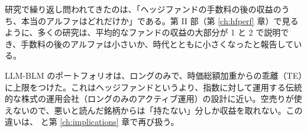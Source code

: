 研究で繰り返し問われてきたのは、「ヘッジファンドの手数料の後の収益のうち、本当のアルファはどれだけか」である。第 II 部（第 \ref{ch:hfperf} 章）で見るように、多くの研究は、平均的なファンドの収益の大部分が 1 と 2 で説明でき、手数料の後のアルファは小さいか、時代とともに小さくなったと報告している。

\begin{projbox}
LLM-BLM のポートフォリオは、ロングのみで、時価総額加重からの乖離（TE）に上限をつけた。これはヘッジファンドというより、指数に対して運用する伝統的な株式の運用会社（ロングのみのアクティブ運用）の設計に近い。空売りが使えないので、悪いと読んだ銘柄からは「持たない」分しか収益を取れない。この違いは、 と第 \ref{ch:implications} 章で再び扱う。
\end{projbox}
